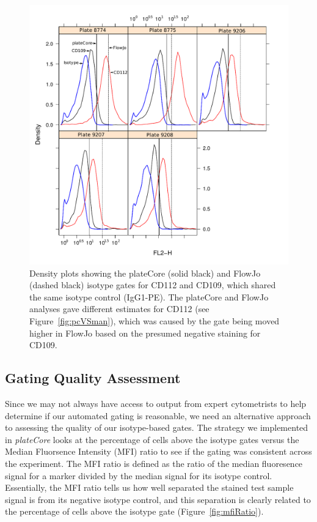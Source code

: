 \documentclass[12pt]{article}
\newcommand{\Rpackage}[1]{{\textit{#1}}}
\begin{document}
\begin{figure}
\centering
\includegraphics{fjVSr3.pdf}
\caption{Density plots showing the plateCore (solid black) and FlowJo (dashed
black) isotype gates for CD112  and CD109, which shared the same isotype control
(IgG1-PE). The plateCore and FlowJo analyses gave different estimates for CD112
(see Figure~\ref{fig:pcVSman}), which was caused by the gate being moved
higher in FlowJo based on the presumed negative staining for CD109.}
\label{fig:pcVSman2}
\end{figure}

\clearpage
\subsection*{Gating Quality Assessment}

Since we may not always have access to output from expert cytometrists to
help determine if our automated gating is reasonable, we need an alternative
approach to assessing the quality of our isotype-based gates. The strategy we
implemented in \Rpackage{plateCore} looks at the percentage of cells above the
isotype gates versus the Median Fluorsence Intensity (MFI) ratio to see if the
gating was consistent across the experiment. The
MFI ratio is defined as the ratio of the median fluoresence signal for a marker
divided by the median signal for its isotype control. Essentially, the MFI
ratio tells us how well separated the stained test sample signal is from its
negative isotype control, and this separation is clearly related to the
percentage of cells above the isotype gate (Figure~\ref{fig:mfiRatio}).
\end{document}

